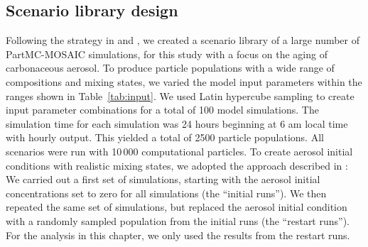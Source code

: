 \documentclass[edeposit,fullpage]{uiucthesis2009}
\begin{document}
\subsection{Scenario library design}
Following the strategy in \citet{zheng2021estimating} and
\citet{hughes2018machine}, we created a scenario library of a large
number of PartMC-MOSAIC simulations, for this study with a focus on
the aging of carbonaceous aerosol. To produce particle populations
with a wide range of compositions and mixing states, we varied the
model input parameters within the ranges shown in
Table~\ref{tab:input}. We used Latin hypercube sampling
\citep{mckay2000comparison} to create input parameter combinations for
a total of 100 model simulations. The simulation time for each
simulation was 24 hours beginning at 6 am local time with hourly
output. This yielded a total of 2500 particle populations. All
scenarios were run with 10\,000 computational particles.  To create
aerosol initial conditions with realistic mixing states, we adopted the
approach described in \citet{zheng2021estimating}: We carried out a first set of
simulations, starting with the aerosol initial concentrations set to
zero for all simulations (the ``initial runs''). We then repeated the
same set of simulations, but replaced the aerosol initial condition
with a randomly sampled population from the initial runs (the
``restart runs''). For the analysis in this chapter, we only used the
results from the restart runs.
\end{document}
